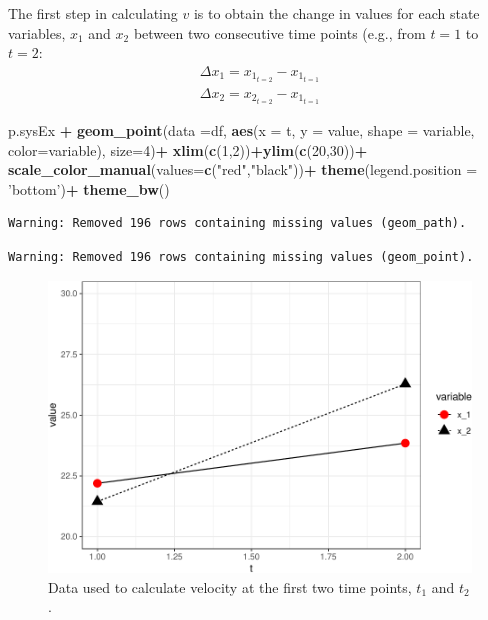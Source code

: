 \documentclass[12pt,twoside,openany]{reedthesis}
\newenvironment{Shaded}{\begin{snugshade}}{\end{snugshade}}
\newcommand{\KeywordTok}[1]{\textcolor[rgb]{0.13,0.29,0.53}{\textbf{#1}}}
\newcommand{\DataTypeTok}[1]{\textcolor[rgb]{0.13,0.29,0.53}{#1}}
\newcommand{\DecValTok}[1]{\textcolor[rgb]{0.00,0.00,0.81}{#1}}
\newcommand{\StringTok}[1]{\textcolor[rgb]{0.31,0.60,0.02}{#1}}
\newcommand{\OperatorTok}[1]{\textcolor[rgb]{0.81,0.36,0.00}{\textbf{#1}}}
\newcommand{\NormalTok}[1]{#1}
\begin{document}
The first step in calculating \(v\) is to obtain the change in values
for each state variables, \(x_1\) and \(x_2\) between two consecutive
time points (e.g., from \(t=1\) to \(t=2\):
\begin{equation}
\begin{array}{rcr}
\Delta x_1 = x_{1_{t=2}} - x_{1_{t=1}} \\
\Delta x_2 = x_{2_{t=2}} - x_{1_{t=1}}
  \end{array}
\label{eq:diffX}
\end{equation}
\begin{Shaded}
\begin{Highlighting}[]
\NormalTok{p.sysEx }\OperatorTok{+}
\StringTok{  }\KeywordTok{geom_point}\NormalTok{(}\DataTypeTok{data =}\NormalTok{df, }\KeywordTok{aes}\NormalTok{(}\DataTypeTok{x =}\NormalTok{ t, }\DataTypeTok{y =}\NormalTok{ value, }\DataTypeTok{shape =}\NormalTok{ variable, }\DataTypeTok{color=}\NormalTok{variable), }\DataTypeTok{size=}\DecValTok{4}\NormalTok{)}\OperatorTok{+}
\StringTok{  }\KeywordTok{xlim}\NormalTok{(}\KeywordTok{c}\NormalTok{(}\DecValTok{1}\NormalTok{,}\DecValTok{2}\NormalTok{))}\OperatorTok{+}\KeywordTok{ylim}\NormalTok{(}\KeywordTok{c}\NormalTok{(}\DecValTok{20}\NormalTok{,}\DecValTok{30}\NormalTok{))}\OperatorTok{+}
\StringTok{  }\KeywordTok{scale_color_manual}\NormalTok{(}\DataTypeTok{values=}\KeywordTok{c}\NormalTok{(}\StringTok{"red"}\NormalTok{,}\StringTok{"black"}\NormalTok{))}\OperatorTok{+}
\StringTok{  }\KeywordTok{theme}\NormalTok{(}\DataTypeTok{legend.position =} \StringTok{'bottom'}\NormalTok{)}\OperatorTok{+}
\StringTok{  }\KeywordTok{theme_bw}\NormalTok{()}
\end{Highlighting}
\end{Shaded}
\begin{verbatim}
Warning: Removed 196 rows containing missing values (geom_path).
\end{verbatim}
\begin{verbatim}
Warning: Removed 196 rows containing missing values (geom_point).
\end{verbatim}
\begin{figure}
\centering
\includegraphics{_myDissertation_files/figure-latex/sysEx2-1.pdf}
\caption{\label{fig:sysEx2}Data used to calculate velocity at the first two
time points, \(t_1\) and \(t_2\).}
\end{figure}
\end{document}
